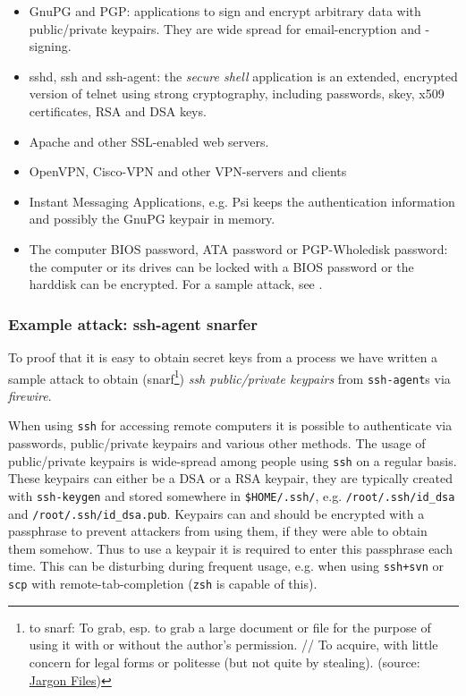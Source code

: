 \begin{itemize}

	\item GnuPG and PGP: applications to sign and encrypt arbitrary data
	with public/private keypairs. They are wide spread for email-encryption
	and -signing.

	\item sshd, ssh and ssh-agent: the \emph{secure shell} application is an
	extended, encrypted version of telnet using strong cryptography,
	including passwords, skey, x509 certificates, RSA and DSA keys.

	\item Apache and other SSL-enabled web servers.

	\item OpenVPN, Cisco-VPN and other VPN-servers and clients

	\item Instant Messaging Applications, e.g. Psi keeps the authentication
	information and possibly the GnuPG keypair in memory.

	\item The computer BIOS password, ATA password or PGP-Wholedisk
		password: the computer or its drives can be locked with a BIOS
		password or the harddisk can be encrypted.  For a sample attack,
		see \cite{rux2k6firewire:2006}.

\end{itemize}


\subsubsection{Example attack: ssh-agent snarfer}

\label{ssh-agent-snarfer} To proof that it is easy to obtain secret keys from a
process we have written a sample attack to obtain
%
(snarf\footnote{to snarf: To grab, esp. to grab a large document or file for the
purpose of using it with or without the author's permission. // To acquire, with
little concern for legal forms or politesse (but not quite by stealing).
(source: \href{http://catb.org/jargon/html/S/snarf.html}{Jargon Files})})
%
\emph{ssh public/private keypairs} from \texttt{ssh-agent}s via \emph{firewire}.

When using \texttt{ssh} for accessing remote computers it is possible to
authenticate via passwords, public/private keypairs and various other methods.
The usage of public/private keypairs is wide-spread among people using
\texttt{ssh} on a regular basis. These keypairs can either be a DSA or a RSA
keypair, they are typically created with \texttt{ssh-keygen} and stored
somewhere in \texttt{\$HOME/.ssh/}, e.g.  \texttt{/root/.ssh/id\_dsa} and
\texttt{/root/.ssh/id\_dsa.pub}. Keypairs can and should be encrypted with a
passphrase to prevent attackers from using them, if they were able to obtain
them somehow. Thus to use a keypair it is required to enter this passphrase each
time. This can be disturbing during frequent usage, e.g. when using
\texttt{ssh+svn} or \texttt{scp} with remote-tab-completion (\texttt{zsh} is
capable of this).


